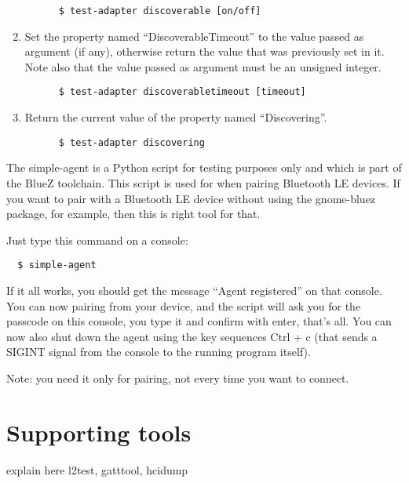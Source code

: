 \documentclass[11pt]{article}
\begin{document}
\begin{enumerate}
\begin{verbatim}
      $ test-adapter discoverable [on/off]
    \end{verbatim}
  \item Set the property named ``DiscoverableTimeout'' to the value
        passed as argument (if any), otherwise return the value that
        was previously set in it. Note also that the value passed as
        argument must be an unsigned integer.
    \begin{verbatim}
      $ test-adapter discoverabletimeout [timeout]
    \end{verbatim}
  \item Return the current value of the property named ``Discovering''.
    \begin{verbatim}
      $ test-adapter discovering
    \end{verbatim}
\end{enumerate}

The simple-agent is a Python script for testing purposes only and which is part
of the BlueZ toolchain. This script is used for when pairing Bluetooth
LE devices. If you want to pair with a Bluetooth LE device without using the
gnome-bluez package, for example, then this is right tool for that.

Just type this command on a console:
\begin{verbatim}
  $ simple-agent
\end{verbatim}

If it all works, you should get the message ``Agent registered'' on
that console. You can now pairing from your device, and the
script will ask you for the passcode on this console, you type it and
confirm with enter, that's all. You can now also shut down the agent
using the key sequences Ctrl + c (that sends a SIGINT signal from
the console to the running program itself).

Note: you need it only for pairing, not every time you want to connect.

\section{Supporting tools}

explain here l2test, gatttool, hcidump
\end{document}

